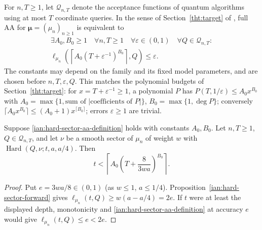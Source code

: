 For \(n,T\ge1\), let \(\mathcal Q_{n,T}\) denote the acceptance functions of quantum algorithms using at most
\(T\) coordinate queries. In the sense of Section~\ref{tht:target} of
, full AA for \(\symbf{\mu}=(\mu_n)_{n\ge1}\) is equivalent to
\[
 \begin{gathered}
 \exists A_0,B_0\ge1\quad\forall n,T\ge1\quad\forall\varepsilon\in(0,1)\quad\forall Q\in\mathcal Q_{n,T}:\\
 \ell_{\mu_n}\!\left(\left\lceil A_0(T+\varepsilon^{-1})^{B_0}\right\rceil,Q\right)\le\varepsilon.
 \end{gathered}
 \tag{AA}\label{ian:hard-sector-aa-definition}
\]
The constants may depend on the family and its fixed model parameters, and are chosen before
\(n,T,\varepsilon,Q\). This matches the polynomial budgets of Section~\ref{tht:target}: for
\(x=T+\varepsilon^{-1}\ge1\), a polynomial \(P\) has \(P(T,1/\varepsilon)\le A_0x^{B_0}\) with
\(A_0=\max\{1,\text{sum of }|\text{coefficients of }P|\}\), \(B_0=\max\{1,\deg P\}\); conversely \(\lceil
A_0x^{B_0}\rceil\le(A_0+1)x^{\lceil B_0\rceil}\); errors \(\varepsilon\ge1\) are trivial.

\begin{lemma}\label{ian:hard-sector-aa-exclusion}
Suppose \eqref{ian:hard-sector-aa-definition} holds with constants \(A_0,B_0\). Let \(n,T\ge1\), \(Q\in\mathcal
Q_{n,T}\), and let \(\nu\) be a smooth sector of \(\mu_n\) of weight \(w\) with
\(\operatorname{Hard}(Q,\nu;t,a,a/4)\). Then
\[t<\left\lceil A_0\left(T+\frac{8}{3wa}\right)^{B_0}\right\rceil.\]
\end{lemma}
\begin{proof}
Put \(e=3wa/8\in(0,1)\) (as \(w\le1\), \(a\le1/4\)). Proposition~\ref{ian:hard-sector-forward} gives
\(\ell_{\mu_n}(t,Q)\ge w(a-a/4)=2e\). If \(t\) were at least the displayed depth, monotonicity and
\eqref{ian:hard-sector-aa-definition} at accuracy \(e\) would give \(\ell_{\mu_n}(t,Q)\le e<2e\).
\end{proof}


